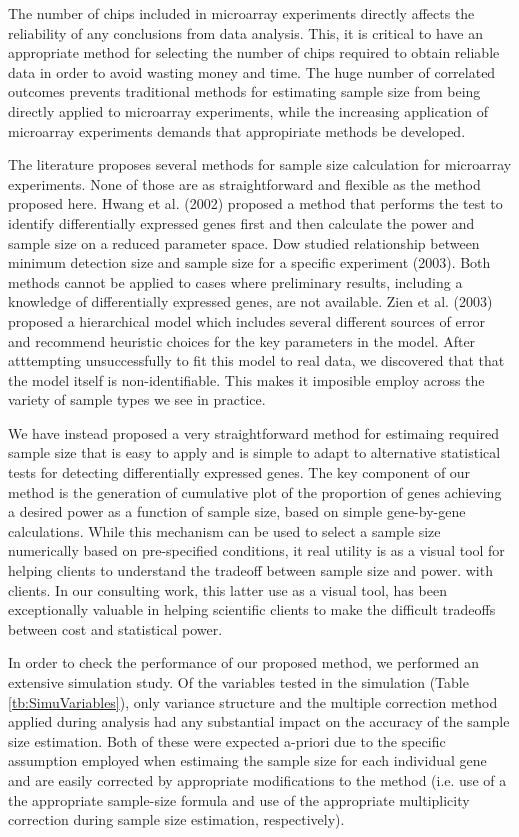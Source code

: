 \documentclass{bioinfo}
\begin{document}
The number of chips included in microarray experiments directly
affects the reliability of any conclusions from data analysis. This,
it is critical to have an appropriate method for selecting the
number of chips required to obtain reliable data in order to avoid
wasting money and time. The huge number of correlated outcomes
prevents traditional methods for estimating sample size from being
directly applied to microarray experiments, while the increasing
application of microarray experiments demands that appropiriate
methods be developed. 

The literature proposes several methods for sample size calculation
for microarray experiments. None of those are as straightforward and
flexible as the method proposed here. Hwang et al. (2002) proposed a
method that performs the test to identify differentially expressed
genes first and then calculate the power and sample size on a
reduced parameter space. Dow studied relationship between minimum
detection size and sample size for a specific experiment
(2003). Both methods cannot be applied to cases where preliminary
results, including a knowledge of differentially expressed genes,
are not available. Zien et al. (2003) proposed a hierarchical model
which includes several different sources of error and recommend
heuristic choices for the key parameters in the model.  After
atttempting unsuccessfully to fit this model to real data, we
discovered that that the model itself is non-identifiable.  This
makes it imposible employ across the variety of
sample types we see in practice.

We have instead proposed a very straightforward method for estimaing
required sample size that is easy to apply and is simple to adapt to
alternative statistical tests for detecting differentially expressed
genes. The key component of our method is the generation of
cumulative plot of the proportion of genes achieving a desired power
as a function of sample size, based on simple gene-by-gene
calculations.  While this mechanism can be used to select a sample
size numerically based on pre-specified conditions, it real utility
is as a visual tool for helping clients to understand the tradeoff
between sample size and power. with clients.  In our consulting
work, this latter use as a visual tool, has been exceptionally
valuable in helping scientific clients to make the difficult
tradeoffs between cost and statistical power.

In order to check the performance of our proposed method, we
performed an extensive simulation study. Of the variables tested in
the simulation (Table \ref{tb:SimuVariables}), only variance
structure and the multiple correction method applied during analysis
had any substantial impact on the accuracy of the sample size
estimation.  Both of these were expected a-priori due to the
specific assumption employed when estimaing the sample size for each
individual gene and are easily corrected by appropriate
modifications to the method (i.e. use of a the appropriate
sample-size formula and use of the appropriate multiplicity
correction during sample size estimation, respectively).
\end{document}
